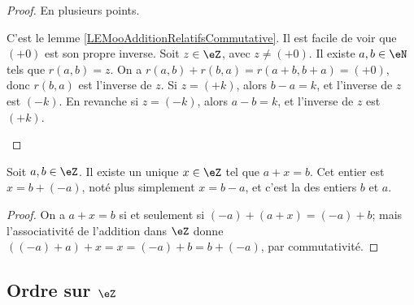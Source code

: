 \begin{proof}
	En plusieurs points.
	\begin{subproof}
			C'est le lemme \ref{LEMooAdditionRelatifsCommutative}.
		\spitem[Inverse]
  		Il est facile de voir que \( (+0) \) est son propre inverse. Soit \( z \in \eZ \), avec \( z \neq (+0) \). Il existe \( a,b  \in \eN \) tels que \( r(a,b) = z \). On a \( r(a,b) + r(b,a) = r(a+b, b+a) = (+0) \), donc \( r(b,a) \) est l'inverse de \( z \). Si \( z = (+k) \), alors \( b - a = k \), et l'inverse de \( z \) est \( (-k) \). En revanche si \( z = (-k) \), alors \( a - b = k \), et l'inverse de \( z \) est \( (+k) \). 
	\end{subproof}
\end{proof}

\begin{theoremDef}	\label{THMooEquationsAdditivesEntiersRelatifs}
	Soit \( a, b \in \eZ \). Il existe un unique \( x \in \eZ\) tel que \( a+x = b \). Cet entier est \( x = b + (-a) \), noté plus simplement \( x = b - a \), et c'est la  des entiers \( b \) et \( a \).
\end{theoremDef}

\begin{proof}
	On a \( a+x = b \) si et seulement si \( (-a) + (a + x) = (-a) + b \); mais l'associativité de l'addition dans \( \eZ \) donne \( ((-a)+a) + x = x = (-a) + b  = b + (-a) \), par commutativité. 
\end{proof}

\subsection{Ordre sur \( \eZ\)}
\label{SUBooEntiersRelatifsOrdre}


